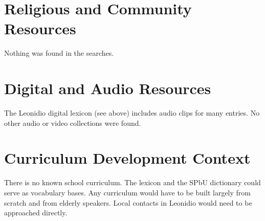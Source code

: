 \documentclass[12pt]{article}
\begin{document}
\section{Religious and Community Resources}
Nothing was found in the searches.

\section{Digital and Audio Resources}
The Leonidio digital lexicon (see above) includes audio clips for many entries. No other audio or video collections were found.

\section{Curriculum Development Context}
There is no known school curriculum. The lexicon and the SPbU dictionary could serve as vocabulary bases. Any curriculum would have to be built largely from scratch and from elderly speakers. Local contacts in Leonidio would need to be approached directly.
\end{document}
